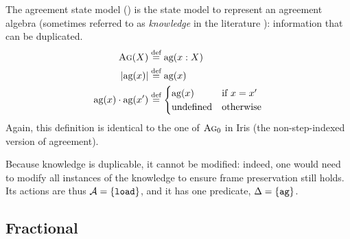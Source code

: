The agreement state model \Ag{}(\Val) is the state model to represent an agreement algebra (sometimes referred to as \emph{knowledge} in the literature \cite{higherorderseplogic}): information that can be duplicated. \begin{align*}
	\textsc{Ag}(X) &\stackrel{\textnormal{def}}= \text{ag}(x: X)\\
	|\text{ag}(x)| &\stackrel{\textnormal{def}}= \text{ag}(x)\\
	\text{ag}(x) \cdot \text{ag}(x') &\stackrel{\textnormal{def}}= \begin{cases}
 	\text{ag}(x) &\text{if}~x = x' \\
 	\text{undefined} &\text{otherwise}
 \end{cases}
\end{align*}
Again, this definition is identical to the one of $\textsc{Ag}_0$ in Iris (the non-step-indexed version of agreement).

Because knowledge is duplicable, it cannot be modified: indeed, one would need to modify all instances of the knowledge to ensure frame preservation still holds. Its actions are thus ${\cal{A}}=\{\texttt{load}\}$, and it has one predicate, $\Delta=\{\texttt{ag}\}$.

\subsection{Fractional}

